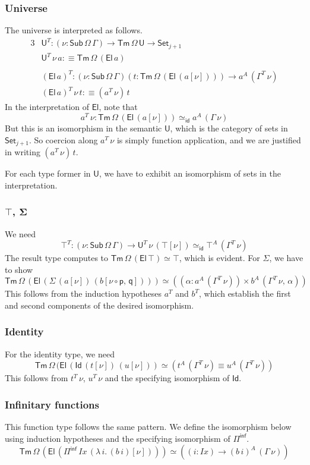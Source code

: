 \documentclass[12pt,a4paper,twoside,openany]{book}
\theoremstyle{remark}
\theoremstyle{definition}
\theoremstyle{theorem}
\newcommand{\mi}[1]{\mathit{#1}}
\newcommand{\bs}[1]{\boldsymbol{#1}}
\newcommand{\id}{\mathsf{id}}
\newcommand{\Sub}{\mathsf{Sub}}
\newcommand{\Tm}{\mathsf{Tm}}
\newcommand{\U}{\mathsf{U}}
\newcommand{\El}{\mathsf{El}}
\newcommand{\Id}{\mathsf{Id}}
\newcommand{\Set}{\mathsf{Set}}
\newcommand{\Piinf}{\Pi^{\mathsf{inf}}}
\newcommand{\p}{\mathsf{p}}
\newcommand{\q}{\mathsf{q}}
\newcommand{\defn}{:\equiv}
\begin{document}
\subsubsection{Universe}
The universe is interpreted as follows.
\begin{alignat*}{3}
  &\U^T : (\nu : \Sub\,\Omega\,\Gamma) \to \Tm\,\Omega\,\U \to \Set_{j + 1} \\
  &\U^T\,\nu\,a \defn \Tm\,\Omega\,(\El\,a) \\
  &\\
  &(\El\,a)^T : (\nu : \Sub\,\Omega\,\Gamma)(t : \Tm\,\Omega\,(\El\,(a[\nu]))) \to a^A\,(\Gamma^T\,\nu)\\
  &(\El\,a)^T\,\nu\,t \defn (a^T\,\nu)\,t
\end{alignat*}
In the interpretation of $\El$, note that
\[
a^T\,\nu : \Tm\,\Omega\,(\El\,(a[\nu])) \simeq_{\id} a^A\,(\Gamma\,\nu)
\]
But this is an isomorphism in the semantic $\U$, which is the category of sets
in $\Set_{j + 1}$. So coercion along $a^T\,\nu$ is simply function application,
and we are justified in writing $(a^T\,\nu)\,t$.

For each type former in $\U$, we have to exhibit an isomorphism of sets in the
interpretation.

\subsubsection{$\bs{\top}$, $\bs{\Sigma}$}
We need
\[
  \top^T : (\nu : \Sub\,\Omega\,\Gamma) \to \U^T\,\nu\,(\top[\nu]) \simeq_{\id} \top^A\,(\Gamma^T\,\nu)
\]
The result type computes to $\Tm\,\Omega\,(\El\,\top) \simeq \top$, which is evident. For $\Sigma$, we
have to show
\[
   \Tm\,\Omega\,(\El\,(\Sigma\,(a[\nu])\,(b[\nu\circ\p,\,\q]))) \simeq ((\alpha : a^A\,(\Gamma^T\,\nu)) \times b^A\,(\Gamma^T\,\nu,\,\alpha))
\]
This follows from the induction hypotheses $a^T$ and $b^T$, which establish the
first and second components of the desired isomorphism.

\subsubsection{Identity}
For the identity type, we need
\[
  \Tm\,\Omega\,(\El\,(\Id\,(t[\nu])\,(u[\nu])) \simeq (t^A\,(\Gamma^T\,\nu) \equiv u^A\,(\Gamma^T\,\nu))
\]
This follows from $t^T\,\nu$, $u^T\,\nu$ and the specifying isomorphism of
$\Id$.

\subsubsection{Infinitary functions}
This function type follows the same pattern. We define the isomorphism below
using induction hypotheses and the specifying isomorphism of $\Piinf$.
\[
\Tm\,\Omega\,(\El\,(\Piinf\,\mi{Ix}\,(\lambda\,i.\,(b\,i)[\nu])))
\simeq
((i : \mi{Ix}) \to (b\,i)^A\,(\Gamma\,\nu))
\]
\end{document}
